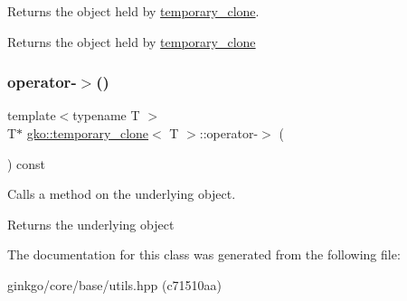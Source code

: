 Returns the object held by \hyperlink{classgko_1_1temporary__clone}{temporary\+\_\+clone}. 

\begin{DoxyReturn}{Returns}
the object held by \hyperlink{classgko_1_1temporary__clone}{temporary\+\_\+clone} 
\end{DoxyReturn}
\mbox{\label{classgko_1_1temporary__clone_a007bc247a9a250dcec8cdadb54710106}} 
\subsubsection{\texorpdfstring{operator-\/$>$()}{operator->()}}
{\footnotesize\ttfamily template$<$typename T $>$ \\
T$\ast$ \hyperlink{classgko_1_1temporary__clone}{gko\+::temporary\+\_\+clone}$<$ T $>$\+::operator-\/$>$ (\begin{DoxyParamCaption}{ }\end{DoxyParamCaption}) const\hspace{0.3cm}{\ttfamily [inline]}}



Calls a method on the underlying object. 

\begin{DoxyReturn}{Returns}
the underlying object 
\end{DoxyReturn}


The documentation for this class was generated from the following file\+:\begin{DoxyCompactItemize}
\item 
ginkgo/core/base/utils.\+hpp (c71510aa)\end{DoxyCompactItemize}
